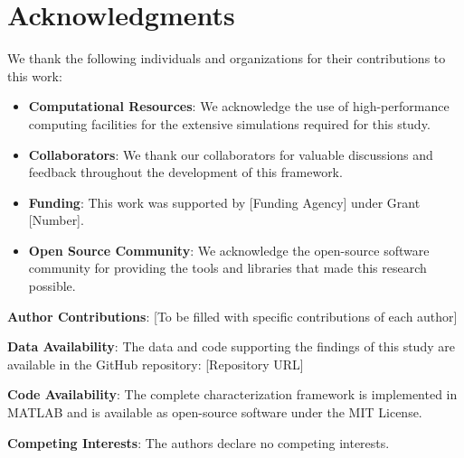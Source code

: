 \section*{Acknowledgments}

We thank the following individuals and organizations for their contributions to this work:

\begin{itemize}
    \item \textbf{Computational Resources}: We acknowledge the use of high-performance computing facilities for the extensive simulations required for this study.
    \item \textbf{Collaborators}: We thank our collaborators for valuable discussions and feedback throughout the development of this framework.
    \item \textbf{Funding}: This work was supported by [Funding Agency] under Grant [Number].
    \item \textbf{Open Source Community}: We acknowledge the open-source software community for providing the tools and libraries that made this research possible.
\end{itemize}

\noindent\textbf{Author Contributions}: [To be filled with specific contributions of each author]

\noindent\textbf{Data Availability}: The data and code supporting the findings of this study are available in the GitHub repository: [Repository URL]

\noindent\textbf{Code Availability}: The complete characterization framework is implemented in MATLAB and is available as open-source software under the MIT License.

\noindent\textbf{Competing Interests}: The authors declare no competing interests.
